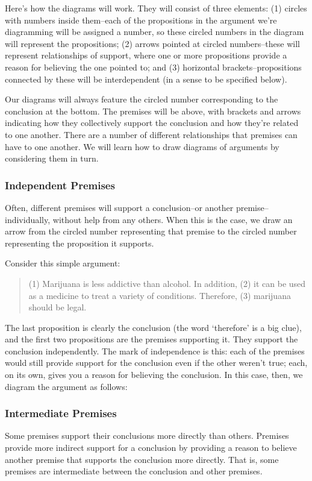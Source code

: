Here's how the diagrams will work. They will consist of three elements: (1) circles with numbers
inside them--each of the propositions in the argument we're diagramming will be assigned a
number, so these circled numbers in the diagram will represent the propositions; (2) arrows pointed
at circled numbers--these will represent relationships of support, where one or more propositions
provide a reason for believing the one pointed to; and (3) horizontal brackets--propositions
connected by these will be interdependent (in a sense to be specified below).

Our diagrams will always feature the circled number corresponding to the conclusion at the
bottom. The premises will be above, with brackets and arrows indicating how they collectively
support the conclusion and how they're related to one another. There are a number of different
relationships that premises can have to one another. We will learn how to draw diagrams of
arguments by considering them in turn.

\subsubsection{Independent Premises}

Often, different premises will support a conclusion--or another premise--individually, without
help from any others. When this is the case, we draw an arrow from the circled number
representing that premise to the circled number representing the proposition it supports.

Consider this simple argument:

\begin{quotation}
(1) Marijuana is less addictive than alcohol. In addition, (2) it can be used as a medicine to
treat a variety of conditions. Therefore, (3) marijuana should be legal.
\end{quotation}

The last proposition is clearly the conclusion (the word `therefore' is a big clue), and the first two
propositions are the premises supporting it. They support the conclusion independently. The mark
of independence is this: each of the premises would still provide support for the conclusion even
if the other weren't true; each, on its own, gives you a reason for believing the conclusion. In this
case, then, we diagram the argument as follows:



\subsubsection{Intermediate Premises}
Some premises support their conclusions more directly than others. Premises provide more indirect
support for a conclusion by providing a reason to believe another premise that supports the
conclusion more directly. That is, some premises are intermediate between the conclusion and
other premises.

